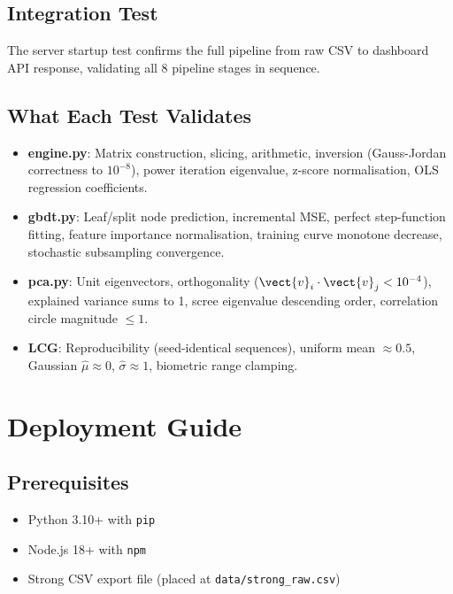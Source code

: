 \documentclass[12pt,a4paper]{report}
\begin{document}
\section{Integration Test}

The server startup test confirms the full pipeline from raw CSV to dashboard
API response, validating all 8 pipeline stages in sequence.

\section{What Each Test Validates}

\begin{itemize}
  \item \textbf{engine.py}: Matrix construction, slicing, arithmetic, inversion
        (Gauss-Jordan correctness to $10^{-8}$), power iteration eigenvalue,
        z-score normalisation, OLS regression coefficients.
  \item \textbf{gbdt.py}: Leaf/split node prediction, incremental MSE, perfect
        step-function fitting, feature importance normalisation, training curve
        monotone decrease, stochastic subsampling convergence.
  \item \textbf{pca.py}: Unit eigenvectors, orthogonality ($\vect{v}_i \cdot \vect{v}_j < 10^{-4}$),
        explained variance sums to 1, scree eigenvalue descending order,
        correlation circle magnitude $\leq 1$.
  \item \textbf{LCG}: Reproducibility (seed-identical sequences), uniform mean
        $\approx 0.5$, Gaussian $\hat{\mu} \approx 0$, $\hat{\sigma} \approx 1$,
        biometric range clamping.
\end{itemize}

\chapter{Deployment Guide}

\section{Prerequisites}

\begin{itemize}
  \item Python 3.10+ with \texttt{pip}
  \item Node.js 18+ with \texttt{npm}
  \item Strong CSV export file (placed at \texttt{data/strong\_raw.csv})
\end{itemize}
\end{document}
